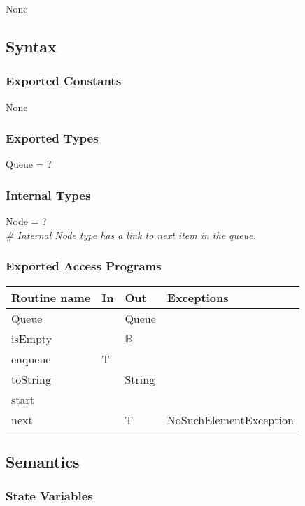 \documentclass[12pt]{article}
\begin{document}
None

\subsection* {Syntax}

\subsubsection* {Exported Constants}

None

\subsubsection* {Exported Types}

Queue = ?

\subsubsection* {Internal Types}

Node = ?\\

\noindent \textit{\# Internal Node type has a link to next item in the queue.}

\subsubsection* {Exported Access Programs}

\begin{tabular}{| l | l | l | p{5cm} |}
\hline
\textbf{Routine name} & \textbf{In} & \textbf{Out} & \textbf{Exceptions}\\
\hline
Queue & ~ & Queue & ~\\
\hline
isEmpty & ~ & $\mathbb{B}$ & ~\\
\hline
enqueue & T & ~ & ~\\
\hline
toString & ~ & String & ~\\
\hline
start & ~ & ~ & ~\\
\hline
next & ~ & T & NoSuchElementException\\
\hline
\end{tabular}

\subsection* {Semantics}

\subsubsection* {State Variables}
\end{document}
